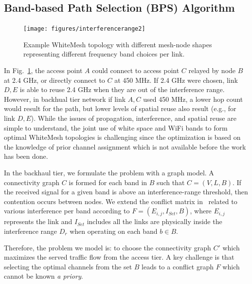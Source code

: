 \subsection{Band-based Path Selection (BPS) Algorithm}
\label{subsec:BPS}

\begin{figure}
\vspace{-0.0in}
\centering
\texttt{[image: figures/interferencerange2]}
\vspace{-0.1in}
\caption{Example WhiteMesh topology with different mesh-node shapes 
representing different frequency band choices per link.}
\label{fig:interferencerange}
\vspace{-0.1in}
\end{figure}

In Fig.~\ref{fig:interferencerange}, the access point $A$ could connect to access point $C$ 
relayed by node $B$ at 2.4 GHz, or directly connect to $C$ at 450 MHz. If 2.4 GHz were 
chosen, link $D,E$ is able to reuse 2.4 GHz when they are out of the interference range. 
However, in backhual tier network if link $A,C$ used 450 MHz, a lower hop count would 
result for the path, but lower levels of spatial reuse also result (e.g., for link $D,E$). 
While the issues of propagation, interference, and spatial reuse are simple to understand, 
the joint use of white space and WiFi bands to form optimal WhiteMesh topologies is 
challenging since the optimization is based on the knowledge of prior channel assignment 
which is not available before the work has been done.

In the backhaul tier, we formulate the problem with a graph model. A connectivity graph $C$ is 
formed for each band in $B$ such that $C=(V,L,B)$. If the received signal for a given band is 
above an interference-range threshold, then contention occurs between nodes. We extend the conflict 
matrix in~\cite{tang2005interference} related to various interference per band according to 
$F=(E_{i,j},I_{Set},B)$, where $E_{i,j}$ represents the link and $I_{Set}$ includes all the links 
are physically inside the interference range $D_r$ when operating on each band $b \in B$.

Therefore, the problem we model is: to choose the connectivity graph $C'$ which maximizes the served 
traffic flow from the access tier. A key challenge is that selecting the optimal channels from the 
set $B$ leads to a conflict graph $F$ which cannot be known {\it a priory}. 


